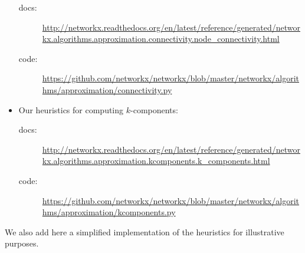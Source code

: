 \begin{itemize}
\begin{tiny}
\begin{description}
\item[docs:] \href{http://networkx.readthedocs.org/en/latest/reference/generated/networkx.algorithms.approximation.connectivity.node_connectivity.html}{http://networkx.readthedocs.org/en/latest/reference/generated/networkx.algorithms.approximation.connectivity.node\_connectivity.html}

\item[code:] \href{https://github.com/networkx/networkx/blob/master/networkx/algorithms/approximation/connectivity.py}{https://github.com/networkx/networkx/blob/master/networkx/algorithms/approximation/connectivity.py}

\end{description}
\end{tiny}

\item Our heuristics for computing $k$-components:

\begin{tiny}
\begin{description}

\item[docs:] \href{http://networkx.readthedocs.org/en/latest/reference/generated/networkx.algorithms.approximation.kcomponents.k_components.html}{http://networkx.readthedocs.org/en/latest/reference/generated/networkx.algorithms.approximation.kcomponents.k\_components.html}

\item[code:] \href{https://github.com/networkx/networkx/blob/master/networkx/algorithms/approximation/kcomponents.py}{https://github.com/networkx/networkx/blob/master/networkx/algorithms/approximation/kcomponents.py }

\end{description}
\end{tiny}

\end{itemize}

We also add here a simplified implementation of the heuristics for illustrative purposes.

\newpage

